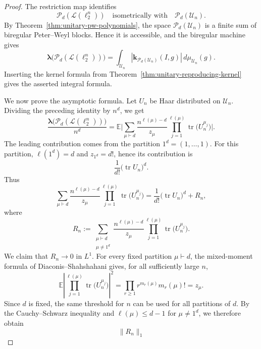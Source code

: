 \documentclass[11pt,showkeys]{amsart}
\begin{document}
\begin{proof}
The restriction map identifies
\[
        \mathcal P_d(\mathcal L(\ell_2^n))
        \quad\text{isometrically with}\quad
        \mathcal P_d(\mathcal U_n).
\]
By Theorem~\ref{thm:unitary-pw-polynomials}, the space
\(\mathcal P_d(\mathcal U_n)\) is a finite sum of biregular
Peter--Weyl blocks. Hence it is accessible, and the biregular machine
gives
\[
        \boldsymbol\lambda\bigl(\mathcal P_d(\mathcal L(\ell_2^n))\bigr)
        =
        \int_{\mathcal U_n}
        \left|
        \mathbf k_{\mathcal P_d(\mathcal U_n)}(I,g)
        \right|
        \,d\mu_{\mathcal U_n}(g).
\]
Inserting the kernel formula from
Theorem~\ref{thm:unitary-reproducing-kernel} gives the asserted integral
formula.

We now prove the asymptotic formula. Let \(U_n\) be Haar distributed on
\(\mathcal U_n\). Dividing the preceding identity by \(n^d\), we get
\[
        \frac{
        \boldsymbol\lambda\bigl(\mathcal P_d(\mathcal L(\ell_2^n))\bigr)}
        {n^d}
        =
        \mathbb E
        \Bigg|
        \sum_{\mu\vdash d}
        \frac{n^{\ell(\mu)-d}}{z_\mu}
        \prod_{j=1}^{\ell(\mu)}
        \operatorname{tr}\bigl(U_n^{\mu_j}\bigr)
        \Bigg|.
\]
The leading contribution comes from the partition
$1^d=(1,\ldots,1)$.
For this partition,
$\ell(1^d)=d$ and $z_{1^d}=d!$,
                hence its contribution is
\[
        \frac1{d!}\bigl(\operatorname{tr}U_n\bigr)^d.
\]
Thus
\[
        \sum_{\mu\vdash d}
        \frac{n^{\ell(\mu)-d}}{z_\mu}
        \prod_{j=1}^{\ell(\mu)}
        \operatorname{tr}\bigl(U_n^{\mu_j}\bigr)
        =
        \frac1{d!}\bigl(\operatorname{tr}U_n\bigr)^d
        +
        R_n,
\]
where
\[
        R_n
        :=
        \sum_{\substack{\mu\vdash d\\ \mu\neq 1^d}}
        \frac{n^{\ell(\mu)-d}}{z_\mu}
        \prod_{j=1}^{\ell(\mu)}
        \operatorname{tr}\bigl(U_n^{\mu_j}\bigr).
\]
We claim that \(R_n\to0\) in \(L^1\). For every fixed partition
\(\mu\vdash d\), the mixed-moment formula of Diaconis--Shahshahani
\cite[Theorem~2]{diaconis1994eigenvalues} gives, for all sufficiently
large \(n\),
\[
        \mathbb E
        \left|
        \prod_{j=1}^{\ell(\mu)}
        \operatorname{tr}\bigl(U_n^{\mu_j}\bigr)
        \right|^2
        =
        \prod_{r\geq1}r^{m_r(\mu)}m_r(\mu)!
        =
        z_\mu.
\]
Since \(d\) is fixed, the same threshold for \(n\) can be used for all
partitions of \(d\). By the Cauchy--Schwarz inequality and
\(\ell(\mu)\leq d-1\) for \(\mu\ne1^d\), we therefore obtain
\[
        \|R_n\|_1
\]
\end{proof}
\end{document}
